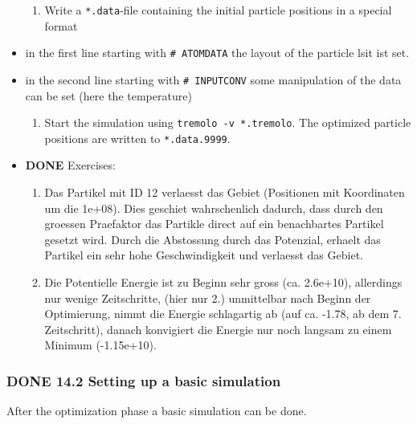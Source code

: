 \documentclass[11pt]{article}
\begin{document}
\begin{itemize}
\begin{enumerate}
\item Write a \texttt{*.data}-file containing the initial particle positions in a special format
\end{enumerate}

\item in the first line starting with \texttt{\# ATOMDATA} the layout of the particle lsit ist set.
\item in the second line starting with \texttt{\# INPUTCONV} some manipulation of the data can be set (here the temperature)

\begin{enumerate}
\item Start the simulation using \texttt{tremolo -v *.tremolo}. The optimized particle positions are written to \texttt{*.data.9999}.
\end{enumerate}

\end{itemize}
\begin{itemize}

\item \textbf{DONE} Exercises:\\
\label{sec-2.4.1.1}

\begin{enumerate}
\item Das Partikel mit ID 12 verlaesst das Gebiet (Positionen mit Koordinaten um die 1e+08). Dies geschiet wahrschenlich dadurch, dass durch den groessen Praefaktor das Partikle direct auf ein benachbartes Partikel gesetzt wird. Durch die Abstossung durch das Potenzial, erhaelt das Partikel ein sehr hohe Geschwindigkeit und verlaesst das Gebiet.
\item Die Potentielle Energie ist zu Beginn sehr gross (ca. 2.6e+10), allerdings nur wenige Zeitschritte, (hier nur 2.) unmittelbar nach Beginn der Optimierung, nimmt die Energie schlagartig ab (auf ca. -1.78, ab dem 7. Zeitschritt), danach konvigiert die Energie nur noch langsam zu einem Minimum (-1.15e+10).
\end{enumerate}
\end{itemize} %
\subsubsection{\textbf{DONE} 14.2 Setting up a basic simulation}
\label{sec-2.4.2}

      After the optimization phase a basic simulation can be done. 
\end{document}
